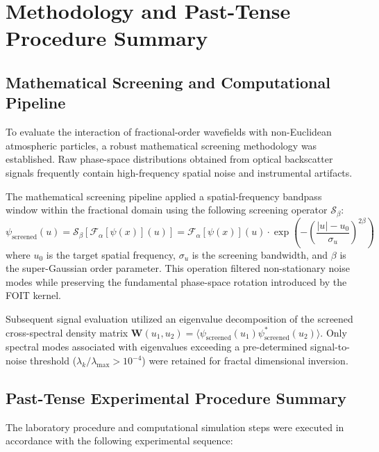 \documentclass{article}
\begin{document}
\newpage

\section{Methodology and Past-Tense Procedure Summary}

\subsection{Mathematical Screening and Computational Pipeline}
To evaluate the interaction of fractional-order wavefields with non-Euclidean atmospheric particles, a robust mathematical screening methodology was established. Raw phase-space distributions obtained from optical backscatter signals frequently contain high-frequency spatial noise and instrumental artifacts. 

The mathematical screening pipeline applied a spatial-frequency bandpass window within the fractional domain using the following screening operator $\mathcal{S}_{\beta}$:
\begin{equation}
\psi_{\text{screened}}(u) = \mathcal{S}_{\beta} \left[ \mathcal{F}_{\alpha}[\psi(x)](u) \right] = \mathcal{F}_{\alpha}[\psi(x)](u) \cdot \exp \left( - \left( \frac{|u| - u_0}{\sigma_u} \right)^{2\beta} \right)
\end{equation}
where $u_0$ is the target spatial frequency, $\sigma_u$ is the screening bandwidth, and $\beta$ is the super-Gaussian order parameter. This operation filtered non-stationary noise modes while preserving the fundamental phase-space rotation introduced by the FOIT kernel.

Subsequent signal evaluation utilized an eigenvalue decomposition of the screened cross-spectral density matrix $\mathbf{W}(u_1, u_2) = \langle \psi_{\text{screened}}(u_1) \psi_{\text{screened}}^{*}(u_2) \rangle$. Only spectral modes associated with eigenvalues exceeding a pre-determined signal-to-noise threshold ($\lambda_k / \lambda_{\text{max}} > 10^{-4}$) were retained for fractal dimensional inversion.

\subsection{Past-Tense Experimental Procedure Summary}
The laboratory procedure and computational simulation steps were executed in accordance with the following experimental sequence:
\end{document}
